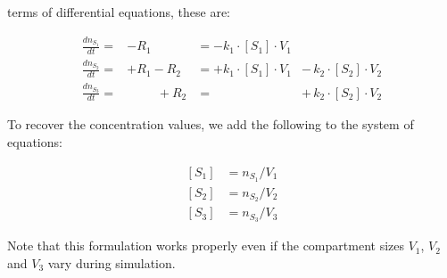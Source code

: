 terms of differential equations, these are:
\begin{linenomath}
\begin{equation*}
  \begin{aligned}
  \frac{dn_{S_1}}{dt} = &- R_1                    &= - k_1 \cdot [S_1] \cdot V_1 &{}\\[4pt]
  \frac{dn_{S_2}}{dt} = &+ R_1 - R_2    &= + k_1 \cdot [S_1] \cdot V_1 &-\, k_2 \cdot [S_2] \cdot V_2\\[4pt]
  \frac{dn_{S_3}}{dt} = &\phantom{{}+ R_1} + R_2  &= \phantom{+ k_1 \cdot [S_2] \cdot V_1} &+\, k_2 \cdot [S_2] \cdot V_2
  \end{aligned}
\end{equation*}
\end{linenomath}
To recover the concentration values, we add the following to the
system of equations:
\begin{linenomath}
\begin{equation*}
\begin{split}
  [S_1] &= n_{S_1}/V_1\\
  [S_2] &= n_{S_2}/V_2\\
  [S_3] &= n_{S_3}/V_3
\end{split}
\end{equation*}
\end{linenomath}
Note that this formulation works properly even if the compartment
sizes $V_1$, $V_2$ and $V_3$ vary during simulation.  

